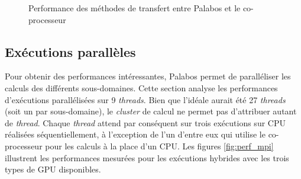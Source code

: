 \begin{figure}[h]
	\centering
	\caption{Performance des méthodes de transfert entre Palabos et le co-processeur}
	\label{fig:trsf_methods}
\end{figure}

\subsection{Exécutions parallèles}
Pour obtenir des performances intéressantes, Palabos permet de paralléliser les calculs des différents sous-domaines. Cette section analyse les performances d'exécutions parallélisées sur 9 \textit{threads}. Bien que l'idéale aurait été 27 \textit{threads} (soit un par sous-domaine), le \textit{cluster} de calcul ne permet pas d'attribuer autant de \textit{thread}. Chaque \textit{thread} attend par conséquent sur trois exécutions sur \acs{CPU} réalisées séquentiellement, à l'exception de l'un d'entre eux qui utilise le co-processeur pour les calculs à la place d'un \acs{CPU}. Les figures \ref{fig:perf_mpi} illustrent les  performances mesurées pour les exécutions hybrides avec les trois types de \acs{GPU} disponibles.

